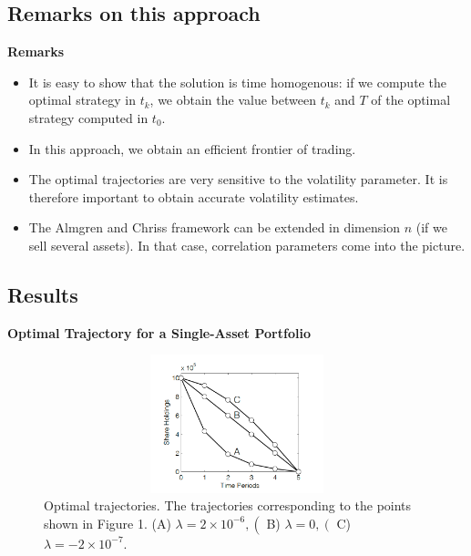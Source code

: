 \documentclass[10pt]{article}
\begin{document}
\subsection{Remarks on this approach}

\textbf{Remarks}

\begin{itemize} 
    \item It is easy to show that the solution is time homogenous: if we compute the optimal strategy in $t_{k}$, we obtain the value between $t_{k}$ and $T$ of the optimal strategy computed in $t_{0}$.
    \item In this approach, we obtain an efficient frontier of trading.
    \item The optimal trajectories are very sensitive to the volatility parameter. It is therefore important to obtain accurate volatility estimates.
    \item The Almgren and Chriss framework can be extended in dimension $n$ (if we sell several assets). In that case, correlation parameters come into the picture.
\end{itemize}

\subsection{Results}

\textbf{Optimal Trajectory for a Single-Asset Portfolio}

\begin{center} 
    \begin{figure}[hbt!]
        \captionsetup{justification=centering,margin=0.5cm}
        \includegraphics[width=13cm,height=4cm,keepaspectratio,]{op1.png}
        \centering
        \caption[caption]{Optimal trajectories. The trajectories corresponding to the points shown in Figure 1. (A) $\lambda=2 \times 10^{-6},\left(\right.$ B) $\lambda=0,\left(\right.$ C) $\lambda=-2 \times 10^{-7}$.
        \cite[p.18]{Almgren_optimalexecution}}
    \end{figure}
\end{center}
\end{document}

